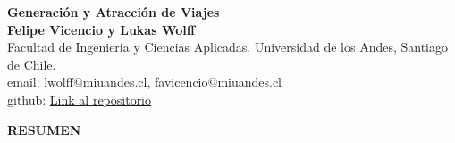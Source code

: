 \documentclass[12pt]{article} %
\begin{document}
\begin{titlepage}%
\newcommand{\HRule}{\rule{\linewidth}{0.5mm}} 
\center 
\begin{center}
    \textbf{\LARGE Generación y Atracción de Viajes} \\[0.5cm]
    \textbf{Felipe Vicencio y Lukas Wolff} \\
    Facultad de Ingenieria y Ciencias Aplicadas, Universidad de los Andes, Santiago de Chile.\\
    email: \href{mailto:lwolff@miuandes.cl}{lwolff@miuandes.cl}, \href{mailto:favicencio@miuandes.cl}{favicencio@miuandes.cl}
    \\
    github: \href{https://github.com/LukasWolff2002/TAREA_2_AUTITOS.git}{Link al repositorio}
\end{center}

\vspace{1cm}

\begin{center}
    \textbf{\large RESUMEN}    
\end{center}


\end{titlepage}
\end{document}
